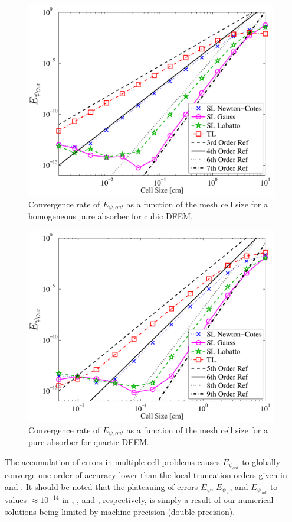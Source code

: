 \begin{figure}[!hbp]
\centering
\includegraphics[width=11cm]{chapter2_constant_xs/Cubic_L2Out_err-eps-converted-to.pdf}
\caption{Convergence rate of $E_{\psi,out}$ as a function of the mesh cell size for a homogeneous pure absorber for cubic DFEM.}
\label{fig:multi_L2Out_p3}
\end{figure}
\begin{figure}[!htp]
\centering
\includegraphics[width=11cm]{chapter2_constant_xs/Quartic_L2Out_err-eps-converted-to.pdf}
\caption{Convergence rate of $E_{\psi,out}$ as a function of the mesh cell size for a pure absorber for quartic DFEM.}
\label{fig:multi_L2Out_p4}
\end{figure}

\pagebreak
The accumulation of errors in multiple-cell problems causes $E_{\psi_{out}}$ to globally converge one order of accuracy lower than the local truncation orders given in  and . 
It should be noted that the plateauing of errors $E_{\psi}$, $E_{\psi_A}$, and $E_{\psi_{out}}$ to values $\approx 10^{-14}$ 
in , , and , respectively, is simply a result of our numerical solutions being limited by machine precision (double precision).

